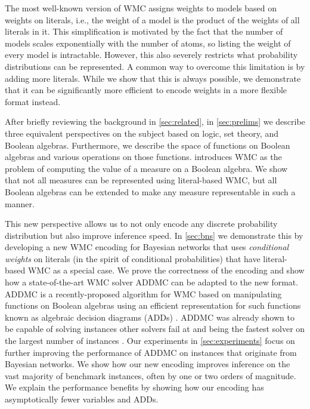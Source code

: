 \documentclass[accepted]{uai2021}
\theoremstyle{definition}
\begin{document}
The most well-known version of WMC assigns weights to models based on
weights on literals, i.e., the weight of a model is the product of the weights
of all literals in it. This simplification is motivated by the fact that the
number of models scales exponentially with the number of atoms, so listing the
weight of every model is intractable. However, this also severely restricts what
probability distributions can be represented. A common way to overcome this
limitation is by adding more literals. While we show that this is always
possible, we demonstrate that it can be significantly more efficient to
encode weights in a more flexible format instead.

After briefly reviewing the background in \cref{sec:related}, in
\cref{sec:prelims} we  describe three equivalent perspectives on the subject
based on logic, set theory, and Boolean algebras. Furthermore, we describe the
space of functions on Boolean algebras and various operations on those
functions.  introduces WMC as the problem of computing
the value of a measure on a Boolean algebra. We show that not all measures can
be represented using literal-based WMC, but all Boolean algebras can be extended
to make any measure representable in such a manner.

This new perspective allows us to not only encode any discrete probability
distribution but also improve inference speed. In \cref{sec:bns} we demonstrate
this by developing a new WMC encoding for Bayesian networks that uses
\emph{conditional weights} on literals (in the spirit of conditional
probabilities) that have literal-based WMC as a special case. We prove the
correctness of the encoding and show how a state-of-the-art WMC solver
\textsf{ADDMC} \citep{DBLP:conf/aaai/DudekPV20} can be adapted to the new
format. \textsf{ADDMC} is a recently-proposed algorithm for WMC based on
manipulating functions on Boolean algebras using an efficient representation for
such functions known as algebraic decision diagrams (ADDs)
\citep{DBLP:journals/fmsd/BaharFGHMPS97}. \textsf{ADDMC} was already shown to be
capable of solving instances other solvers fail at and being the fastest solver
on the largest number of instances \citep{DBLP:conf/aaai/DudekPV20}. Our
experiments in \cref{sec:experiments} focus on further improving the performance
of \textsf{ADDMC} on instances that originate from Bayesian networks. We show
how our new encoding improves inference on the vast majority of benchmark
instances, often by one or two orders of magnitude. We explain the performance
benefits by showing how our encoding has asymptotically fewer variables and
ADDs.
\end{document}
